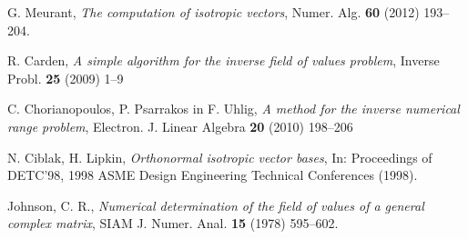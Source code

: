 \documentclass[12pt,a4paper]{amsart}
\theoremstyle{definition}
\theoremstyle{plain}
\begin{document}
\begin{thebibliography}{99}

G. Meurant, \emph{The computation of isotropic vectors}, Numer. Alg. {\bf 60} (2012) 193--204.

R. Carden, \emph{A simple algorithm for the inverse field of values problem}, Inverse Probl. {\bf 25} (2009) 1--9

C. Chorianopoulos, P. Psarrakos in F. Uhlig, \emph{A method for the inverse numerical range problem}, Electron. J. Linear Algebra {\bf 20} (2010) 198--206

N. Ciblak, H. Lipkin, \emph{Orthonormal isotropic vector bases}, In: Proceedings of DETC'98, 1998 ASME Design Engineering Technical Conferences (1998).

Johnson, C. R., \emph{Numerical determination of the field of values of a general complex matrix}, SIAM J. Numer. Anal. {\bf15} (1978) 595--602.


\end{thebibliography}
\end{document}
